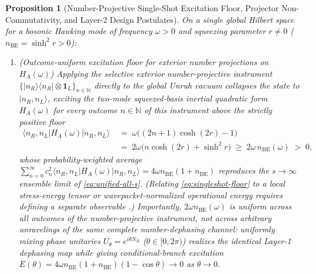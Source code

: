 \documentclass[11pt,a4paper]{article}
\newtheorem{proposition}{Proposition}
\theoremstyle{definition}
\theoremstyle{remark}
\newcommand{\1}{\mathbf{1}}
\begin{document}
\begin{proposition}[Number-Projective Single-Shot Excitation Floor, Projector Non-Commutativity, and Layer-2 Design Postulates]\label{prop:layer2-singleshot}
On a single global Hilbert space for a bosonic Hawking mode of frequency $\omega>0$ and squeezing parameter $r\neq 0$ ($n_{\mathrm{BE}}=\sinh^2 r > 0$):
\begin{enumerate}
  \item[(a)] \emph{(Outcome-uniform excitation floor for exterior number projections on $H_A(\omega)$)} Applying the selective exterior number-projective instrument $\{|n_R\rangle\langle n_R|\otimes\1_L\}_{n\in\mathbb{N}}$ directly to the global Unruh vacuum collapses the state to $|n_R,n_L\rangle$, exciting the two-mode squeezed-basis inertial quadratic form $H_A(\omega)$ for \emph{every} outcome $n\in\mathbb{N}$ of this instrument above the strictly positive floor
  \begin{equation}\label{eq:singleshot-floor}
    \begin{aligned}
      \langle n_R,n_L | H_A(\omega) | n_R,n_L\rangle
      &\;=\; \omega\bigl((2n+1)\cosh(2r) - 1\bigr) \\
      &\;=\; 2\omega\bigl(n\cosh(2r) + \sinh^2 r\bigr) \;\ge\; 2\omega\,n_{\mathrm{BE}}(\omega) \;>\; 0,
    \end{aligned}
  \end{equation}
  whose probability-weighted average $\sum_{n=0}^\infty c_n^2\langle n_R,n_L|H_A(\omega)|n_R,n_L\rangle = 4\omega n_{\mathrm{BE}}(1+n_{\mathrm{BE}})$ reproduces the $s\to\infty$ ensemble limit of \eqref{eq:unified-all-s}. (Relating \eqref{eq:singleshot-floor} to a local stress-energy tensor or wavepacket-normalized operational energy requires defining a separate observable \cite{Bruschi2010}.) Importantly, $2\omega n_{\mathrm{BE}}(\omega)$ is uniform across all outcomes of the \emph{number-projective} instrument, not across arbitrary unravelings of the same complete number-dephasing channel: uniformly mixing phase unitaries $U_\theta=e^{i\theta N_R}$ ($\theta\in[0,2\pi)$) realizes the identical Layer-1 dephasing map while giving conditional-branch excitation $E(\theta)=4\omega n_{\mathrm{BE}}(1+n_{\mathrm{BE}})(1-\cos\theta)\to 0$ as $\theta\to 0$.

\end{enumerate}
\end{proposition}
\end{document}
